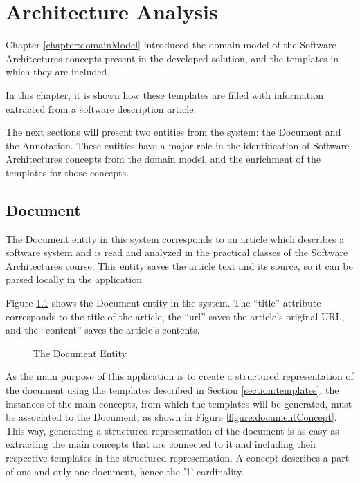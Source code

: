 
\chapter{Architecture Analysis}
\label{chapter:architecture}
Chapter \ref{chapter:domainModel} introduced the domain model of the Software Architectures concepts present in the developed solution, and the templates in which they are included.

In this chapter, it is shown how these templates are filled with information extracted from a software description article.

The next sections will present two entities from the system: the Document and the Annotation. These entities have a major role in the identification of Software Architectures concepts from the domain model, and the enrichment of the templates for those concepts.

\section{Document}
\label{section:document}

The Document entity in this system corresponds to an article which describes a software system and is read and analyzed in the practical classes of the Software Architectures course. This entity saves the article text and its source, so it can be parsed locally in the application

Figure \ref{figure:documentEntity} shows the Document entity in the system. The ``title'' attribute corresponds to the title of the article, the ``url'' saves the article's original URL, and the ``content'' saves the article's contents.

\begin{figure}[h]
\centering
\renewcommand {\umltextcolor}{black}
\renewcommand {\umlfillcolor}{none}
\renewcommand {\umldrawcolor}{black}

\caption{The Document Entity}
\label{figure:documentEntity}
\end{figure}

As the main purpose of this application is to create a structured representation of the document using the templates described in Section \ref{section:templates}, the instances of the main concepts, from which the templates will be generated, must be associated to the Document, as shown in Figure \ref{figure:documentConcept}. This way, generating a structured representation of the document is as easy as extracting the main concepts that are connected to it and including their respective templates in the structured representation. A concept describes a part of one and only one document, hence the '1' cardinality.  

